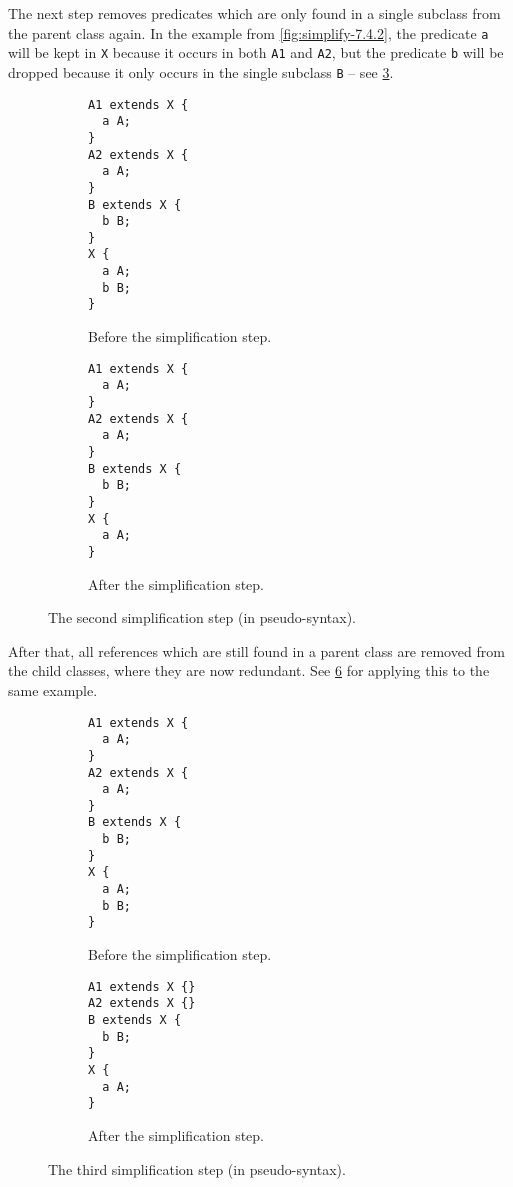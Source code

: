 The next step removes predicates which are only found in a single subclass
from the parent class again.
In the example from \cref{fig:simplify-7.4.2},
the predicate \lstinline{a} will be kept in \lstinline{X}
because it occurs in both \lstinline{A1} and \lstinline{A2},
but the predicate \lstinline{b} will be dropped
because it only occurs in the single subclass \lstinline{B} –
see \cref{fig:simplify-7.4.3}.

\begin{figure}[h]
  \begin{subfigure}[t]{0.45\textwidth}
    \begin{lstlisting}
A1 extends X {
  a A;
}
A2 extends X {
  a A;
}
B extends X {
  b B;
}
X {
  a A;
  b B;
}
    \end{lstlisting}
    \caption{Before the simplification step.}
    \label{fig:simplify-7.4.3-before}
  \end{subfigure}
  \begin{subfigure}[t]{0.45\textwidth}
    \begin{lstlisting}
A1 extends X {
  a A;
}
A2 extends X {
  a A;
}
B extends X {
  b B;
}
X {
  a A;
}
    \end{lstlisting}
    \caption{After the simplification step.}
    \label{fig:simplify-7.4.3-after}
  \end{subfigure}
  \caption{The second simplification step (in pseudo-syntax).}
  \label{fig:simplify-7.4.3}
\end{figure}

After that, all references which are still found in a parent class
are removed from the child classes, where they are now redundant.
See \cref{fig:simplify-7.4.4} for applying this to the same example.

\begin{figure}[h]
  \begin{subfigure}[t]{0.45\textwidth}
    \begin{lstlisting}
A1 extends X {
  a A;
}
A2 extends X {
  a A;
}
B extends X {
  b B;
}
X {
  a A;
  b B;
}
    \end{lstlisting}
    \caption{Before the simplification step.}
    \label{fig:simplify-7.4.4-before}
  \end{subfigure}
  \begin{subfigure}[t]{0.45\textwidth}
    \begin{lstlisting}
A1 extends X {}
A2 extends X {}
B extends X {
  b B;
}
X {
  a A;
}
    \end{lstlisting}
    \caption{After the simplification step.}
    \label{fig:simplify-7.4.4-after}
  \end{subfigure}
  \caption{The third simplification step (in pseudo-syntax).}
  \label{fig:simplify-7.4.4}
\end{figure}

